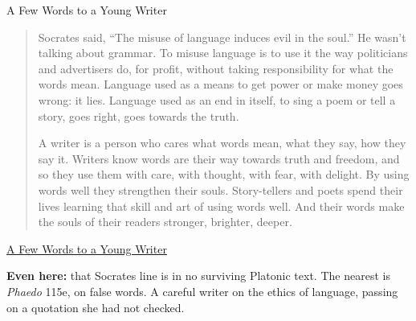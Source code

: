 \documentclass[aspectratio=169]{beamer}
\begin{document}
\begin{frame}{A Few Words to a Young Writer}
\small
        \begin{quotation}
        Socrates said, “The misuse of language induces evil in the soul.” He wasn't talking about grammar. To misuse language is to use it the way  politicians and advertisers do, for profit, without taking responsibility for what the words mean. Language used as a means to get power or make money goes wrong: it lies. Language used as an end in itself, to sing a poem or tell a story, goes right, goes towards the truth.


A writer is a person who cares what words mean, what they say, how they say it. Writers know words are their way towards truth and freedom, and so they use them with care, with thought, with fear, with delight. By using words well they strengthen their souls. Story-tellers and poets spend their lives learning that skill and art of using words well. And their words make the souls of their readers stronger, brighter, deeper.
      \end{quotation}
\href{https://www.ursulakleguin.com/a-few-words-to-a-young-writer}{A Few Words to a Young Writer}
\vspace{1ex}

{\footnotesize \textbf{Even here:} that Socrates line is in no surviving
Platonic text.  The nearest is \emph{Phaedo} 115e, on false words.  A careful
writer on the ethics of language, passing on a quotation she had not checked.}

    \end{frame}

\end{document}
